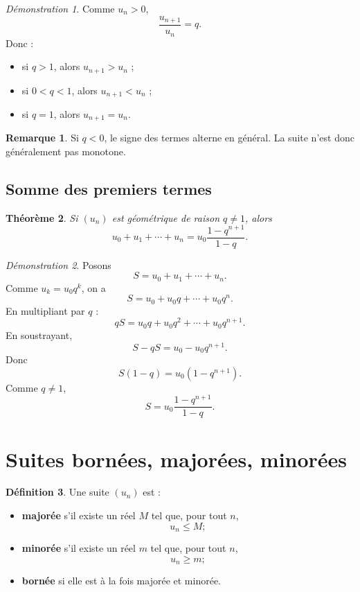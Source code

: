 \documentclass[11pt,a4paper]{article}
\theoremstyle{definition}
\newtheorem{definition}{Définition}[section]
\newtheorem{remarque}[definition]{Remarque}
\theoremstyle{plain}
\newtheorem{theoreme}[definition]{Théorème}
\theoremstyle{remark}
\newtheorem*{demonstrationlibre}{Démonstration}
\begin{document}
\begin{demonstrationlibre}
Comme $u_n>0$,
\[
\frac{u_{n+1}}{u_n}=q.
\]
Donc :
\begin{itemize}[leftmargin=0.8cm]
    \item si $q>1$, alors $u_{n+1}>u_n$ ;
    \item si $0<q<1$, alors $u_{n+1}<u_n$ ;
    \item si $q=1$, alors $u_{n+1}=u_n$.
\end{itemize}
\end{demonstrationlibre}

\begin{remarque}
Si $q<0$, le signe des termes alterne en général. La suite n'est donc généralement pas monotone.
\end{remarque}

\subsection{Somme des premiers termes}

\begin{theoreme}
Si $(u_n)$ est géométrique de raison $q\neq1$, alors
\[
u_0+u_1+\cdots+u_n=u_0\frac{1-q^{n+1}}{1-q}.
\]
\end{theoreme}

\begin{demonstrationlibre}
Posons
\[
S=u_0+u_1+\cdots+u_n.
\]
Comme $u_k=u_0q^k$, on a
\[
S=u_0+u_0q+\cdots+u_0q^n.
\]
En multipliant par $q$ :
\[
qS=u_0q+u_0q^2+\cdots+u_0q^{n+1}.
\]
En soustrayant,
\[
S-qS=u_0-u_0q^{n+1}.
\]
Donc
\[
S(1-q)=u_0(1-q^{n+1}).
\]
Comme $q\neq1$,
\[
S=u_0\frac{1-q^{n+1}}{1-q}.
\]
\end{demonstrationlibre}

\section{Suites bornées, majorées, minorées}

\begin{definition}
Une suite $(u_n)$ est :
\begin{itemize}[leftmargin=0.8cm]
    \item \textbf{majorée} s'il existe un réel $M$ tel que, pour tout $n$,
    \[
    u_n\leq M ;
    \]
    \item \textbf{minorée} s'il existe un réel $m$ tel que, pour tout $n$,
    \[
    u_n\geq m ;
    \]
    \item \textbf{bornée} si elle est à la fois majorée et minorée.
\end{itemize}
\end{definition}
\end{document}
